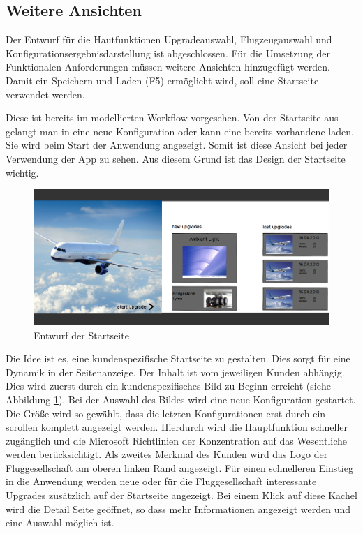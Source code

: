 \subsection{Weitere Ansichten}
Der Entwurf für die Hautfunktionen Upgradeauswahl, Flugzeugauswahl und Konfigurationsergebnisdarstellung ist abgeschlossen. Für die Umsetzung der Funktionalen-Anforderungen müssen weitere Ansichten hinzugefügt werden. Damit ein Speichern und Laden (F5) ermöglicht wird, soll eine Startseite verwendet werden. 

Diese ist bereits im modellierten Workflow vorgesehen. Von der Startseite aus gelangt man in eine neue Konfiguration oder kann eine bereits vorhandene laden. Sie wird beim Start der Anwendung angezeigt. Somit ist diese Ansicht bei jeder Verwendung der App zu sehen. Aus diesem Grund ist das Design der Startseite wichtig. \par
\begin{figure}[H]
\centering
\includegraphics[width=\hsize]{images/start_entwurf}
\caption{Entwurf der Startseite}
\label{startSketch}
\end{figure}
Die Idee ist es, eine kundenspezifische Startseite zu gestalten. Dies sorgt für eine Dynamik in der Seitenanzeige. Der Inhalt ist vom jeweiligen Kunden abhängig. Dies wird zuerst durch ein kundenspezifisches Bild zu Beginn erreicht (siehe Abbildung \ref{startSketch}). Bei der Auswahl des Bildes wird eine neue Konfiguration gestartet. Die Größe wird so gewählt, dass die letzten Konfigurationen erst durch ein scrollen komplett angezeigt werden. Hierdurch wird die Hauptfunktion schneller zugänglich und  die Microsoft Richtlinien der Konzentration auf das Wesentliche werden berücksichtigt. Als zweites Merkmal des Kunden wird das Logo der Fluggesellschaft am oberen linken Rand angezeigt. Für einen schnelleren Einstieg in die Anwendung werden neue oder für die Fluggesellschaft interessante Upgrades zusätzlich auf der Startseite angezeigt. Bei einem Klick auf diese Kachel wird die Detail Seite geöffnet, so dass mehr Informationen angezeigt werden und eine Auswahl möglich ist. 
\par 

